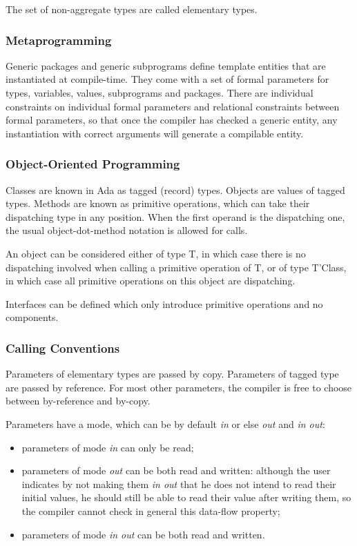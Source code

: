 \documentclass{article}
\begin{document}
The set of non-aggregate types are called elementary types.

\subsubsection{Metaprogramming}

Generic packages and generic subprograms define template entities that are
instantiated at compile-time. They come with a set of formal parameters for
types, variables, values, subprograms and packages. There are individual
constraints on individual formal parameters and relational constraints between
formal parameters, so that once the compiler has checked a generic entity, any
instantiation with correct arguments will generate a compilable entity.

\subsubsection{Object-Oriented Programming}

Classes are known in Ada as tagged (record) types. Objects are values of tagged
types. Methods are known as primitive operations, which can take their
dispatching type in any position. When the first operand is the dispatching
one, the usual object-dot-method notation is allowed for calls.

An object can be considered either of type T, in which case there is no
dispatching involved when calling a primitive operation of T, or of type
T'Class, in which case all primitive operations on this object are dispatching.

Interfaces can be defined which only introduce primitive operations and no
components.

\subsubsection{Calling Conventions}

Parameters of elementary types are passed by copy.  Parameters of tagged type
are passed by reference. For most other parameters, the compiler is free to
choose between by-reference and by-copy.

Parameters have a mode, which can be by default \emph{in} or else \emph{out}
and \emph{in out}:
\begin{itemize}
\item parameters of mode \emph{in} can only be read;
\item parameters of mode \emph{out} can be both read and written: although the
  user indicates by not making them \emph{in out} that he does not intend to
  read their initial values, he should still be able to read their value after
  writing them, so the compiler cannot check in general this data-flow
  property;
\item parameters of mode \emph{in out} can be both read and written.
\end{itemize}
\end{document}

